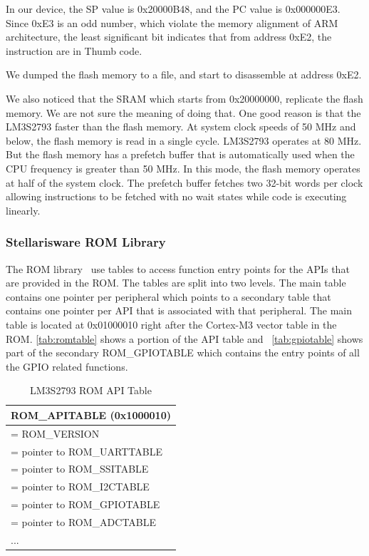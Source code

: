 In our device, the SP value is 0x20000B48, and the PC value is 0x000000E3. Since 0xE3 is an odd number, which violate the memory alignment of ARM architecture, the least significant bit indicates that from address 0xE2, the instruction are in Thumb code.

We dumped the flash memory to a file, and start to disassemble at address 0xE2.

We also noticed that the SRAM which starts from 0x20000000, replicate the flash memory. We are not sure the meaning of doing that. One good reason is that the LM3S2793 faster than the flash memory. At system clock speeds of 50 MHz and below, the flash memory is read in a single cycle. LM3S2793 operates at 80 MHz. But the flash memory has a prefetch buffer that is automatically used when the CPU frequency is greater than 50 MHz. In this mode, the flash memory operates at half of the system clock. The prefetch buffer fetches two 32-bit words per clock allowing instructions to be fetched with no wait states while code is executing linearly.




\subsubsection{Stellarisware ROM Library}
The ROM library~\cite{lm3s2793rom} use tables to access function entry points for the APIs that are provided in the ROM. The tables are split into two levels. The main table contains one pointer per peripheral which points to a secondary table that contains one pointer per API that is associated with that peripheral. The main table is located at 0x01000010 right after the Cortex-M3 vector table in the ROM. \autoref{tab:romtable} shows a portion of the API table and ~\autoref{tab:gpiotable} shows part of the secondary ROM\_GPIOTABLE which contains the entry points of all the GPIO related functions.

\begin{center}
	\begin{table}
		\begin{tabular}{|p{7.2cm}|} 
			\hline
			ROM\_APITABLE (0x1000010) \\ [0.5ex] 
			\hline
			[0] = ROM\_VERSION \\
			\hline
			[1] = pointer to ROM\_UARTTABLE \\
			\hline
			[2] = pointer to ROM\_SSITABLE \\
			\hline
			[3] = pointer to ROM\_I2CTABLE \\
			\hline
			[4] = pointer to ROM\_GPIOTABLE \\
			\hline
			[5] = pointer to ROM\_ADCTABLE \\
			\hline
			... \\ 
			\hline
		\end{tabular}
		\caption{LM3S2793 ROM API Table}
		\label{tab:romtable}
	\end{table}
\end{center}

